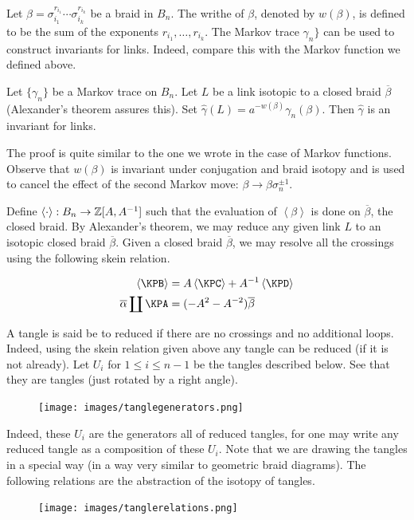 Let $\beta = \sigma_{i_1}^{r_{i_1}}\cdots\sigma_{i_k}^{r_{i_k}}$ be a braid in $B_n$. The writhe of $\beta$, denoted by $w(\beta)$, is defined to be the sum of the exponents $r_{i_1}, \ldots, r_{i_k}$. The Markov trace $\gamma_n\}$ can be used to construct invariants for links. Indeed, compare this with the Markov function we defined above.

\begin{theorem}
\label{sec:temp-lieb-algebra-2}
Let $\{ \gamma_n  \}$ be a Markov trace on $B_n$. Let $L$ be a link isotopic to a closed braid $\overline{\beta}$ (Alexander's theorem assures this). Set $\hat{\gamma}(L) = a^{-w(\beta)} \gamma_n(\beta) $. Then $\hat{\gamma}$ is an invariant for links.
\end{theorem}

The proof is quite similar to the one we wrote in the case of Markov functions. Observe that $w(\beta)$ is invariant under conjugation and braid isotopy and is used to cancel the effect of the second Markov move: $\beta \to \beta\sigma_n^{\pm 1}$.

Define $\left< \cdot \right> : B_n \to \mathbb{Z}[A, A^{-1}]$ such that the evaluation of $\left< \beta \right>$ is done on $\overline{\beta}$, the closed braid. By Alexander's theorem, we may reduce any given link $L$ to an isotopic closed braid $\overline{\beta}$. Given a closed braid $\overline{\beta}$, we may resolve all the crossings using the following skein relation.

\begin{align}
\label{eq:6}
\begin{split}
  \left<\KPB\right> &= A \left<\KPC\right> + A^{-1} \left<\KPD\right> \\
  \overline{\alpha} \coprod \KPA &= (-A^2 - A^{-2}) \overline{\beta}
\end{split}
\end{align}

A tangle is said be to reduced if there are no crossings and no additional loops. Indeed, using the skein relation given above any tangle can be reduced (if it is not already). Let $U_i$ for $1 \leq i \leq n-1$ be the tangles described below. See that they are tangles (just rotated by a right angle).
\vspace*{-.25em}
\begin{figure}[h]
  \centering
  \texttt{[image: images/tanglegenerators.png]}
\end{figure}
\vspace*{-.25em}
Indeed, these $U_i$ are the generators all of reduced tangles, for one may write any reduced tangle as a composition of these $U_i$. Note that we are drawing the tangles in a special way (in a way very similar to geometric braid diagrams). The following relations are the abstraction of the isotopy of tangles.
\vspace*{-.25em}
\begin{figure}[h]
  \centering
  \texttt{[image: images/tanglerelations.png]}
\end{figure}
\vspace*{-.25em}

